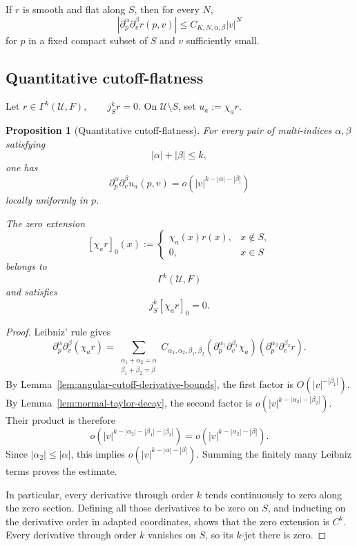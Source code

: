 \documentclass[11pt]{article}
\theoremstyle{plain}
\newtheorem{proposition}[theorem]{Proposition}
\theoremstyle{definition}
\begin{document}
If \(r\) is smooth and flat along \(S\), then for every \(N\),
\[
  \left|
    \partial_p^\alpha
    \partial_v^\beta r(p,v)
  \right|
  \leq
  C_{K,N,\alpha,\beta}
  |v|^N
\]
for \(p\) in a fixed compact subset of \(S\) and \(v\) sufficiently
small.

\subsection{Quantitative cutoff-flatness}
\label{appsubsec:detailed-cutoff-flatness}

Let
\(r\in\Gamma^k(\mathcal U,F), \qquad j_S^k r=0\).
On \(\mathcal U\setminus S\), set
\(u_a:=\chi_ar\).

\begin{proposition}[Quantitative cutoff-flatness]
\label{prop:quantitative-cutoff-flatness}
For every pair of multi-indices \(\alpha,\beta\) satisfying
\[
  |\alpha|+|\beta|\leq k,
\]
one has
\[
  \boxed{
  \partial_p^\alpha
  \partial_v^\beta u_a(p,v)
  =
  o
  \left(
    |v|^{k-|\alpha|-|\beta|}
  \right)
  }
\]
locally uniformly in \(p\).

The zero extension
\[
  [\chi_ar]_0(x)
  :=
  \begin{cases}
    \chi_a(x)r(x),&x\notin S,\\
    0,&x\in S
  \end{cases}
\]
belongs to
\[
  \Gamma^k(\mathcal U,F)
\]
and satisfies
\[
  j_S^k[\chi_ar]_0=0.
\]
\end{proposition}

\begin{proof}
Leibniz' rule gives
\[
  \partial_p^\alpha
  \partial_v^\beta
  (\chi_ar)
  =
  \sum_{
    \substack{
      \alpha_1+\alpha_2=\alpha\\
      \beta_1+\beta_2=\beta
    }
  }
  C_{\alpha_1,\alpha_2,\beta_1,\beta_2}
  \left(
    \partial_p^{\alpha_1}
    \partial_v^{\beta_1}\chi_a
  \right)
  \left(
    \partial_p^{\alpha_2}
    \partial_v^{\beta_2}r
  \right).
\]
By
Lemma~\ref{lem:angular-cutoff-derivative-bounds},
the first factor is
\(O \left( |v|^{-|\beta_1|} \right)\).
By
Lemma~\ref{lem:normal-taylor-decay},
the second factor is
\(o \left( |v|^{ k-|\alpha_2|-|\beta_2| } \right)\).
Their product is therefore
\[
  o
  \left(
    |v|^{
      k-|\alpha_2|-|\beta_1|-|\beta_2|
    }
  \right)
  =
  o
  \left(
    |v|^{
      k-|\alpha_2|-|\beta|
    }
  \right).
\]
Since
\(|\alpha_2|\leq|\alpha|\),
this implies
\(o \left( |v|^{k-|\alpha|-|\beta|} \right)\).
Summing the finitely many Leibniz terms proves the estimate.

In particular, every derivative through order \(k\) tends
continuously to zero along the zero section. Defining all those
derivatives to be zero on \(S\), and inducting on the derivative order
in adapted coordinates, shows that the zero extension is \(C^k\).
Every derivative through order \(k\) vanishes on \(S\), so its
\(k\)-jet there is zero.
\end{proof}
\end{document}
